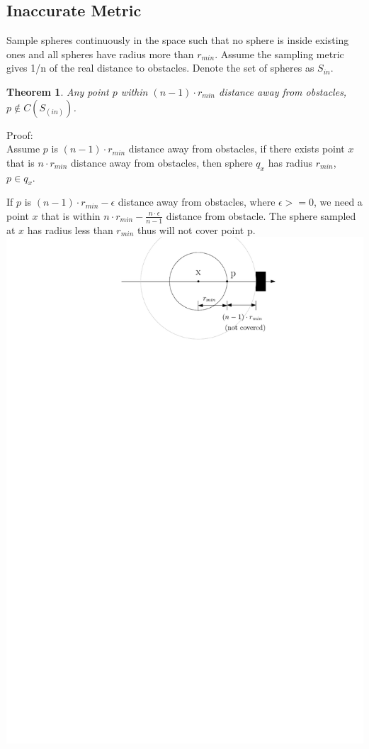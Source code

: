 \documentclass[12pt]{article}
\newtheorem{theorem}{Theorem}[section]
\begin{document}
  \subsection{Inaccurate Metric}
  Sample spheres continuously in the space such that no sphere is inside existing ones and all spheres have radius more than $r_{min}$. Assume the sampling metric gives 1/n of the real distance to obstacles. Denote the set of spheres as $S_{in}$.
  \begin{theorem}
  Any point $p$ within $(n-1) \cdot r_{min}$ distance away from obstacles, $p \notin C(S_(in))$.
  \end{theorem}
  
  Proof:\\
  
  Assume $p$ is $(n-1) \cdot r_{min}$ distance away from obstacles, if there exists point $x$ that is $n \cdot r_{min}$ distance away from obstacles, then sphere $q_{x}$ has radius $r_{min}$, $p \in q_{x}$. 
  
  If $p$ is $(n-1) \cdot r_{min} - \epsilon$ distance away from obstacles, where $\epsilon >= 0$, we need a point $x$ that is within $n \cdot r_{min} - \frac{n \cdot \epsilon}{n-1}$ distance from obstacle.  The sphere sampled at $x$ has radius less than $r_{min}$ thus will not cover point p.\\
 
  \includegraphics[scale=0.8]{sample_S_in} \\
  
\end{document}
